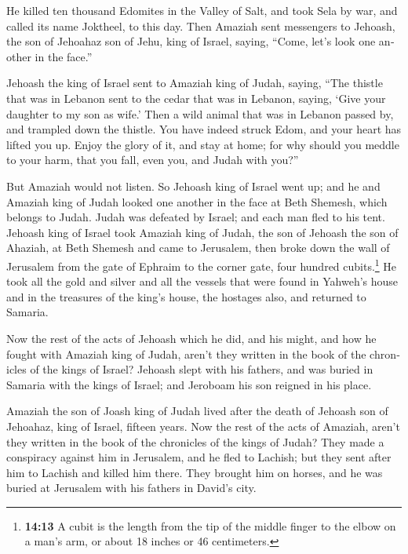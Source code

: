 \begin{paracol}{2}
\begin{otherlanguage}{english}
 He killed ten thousand Edomites in the Valley of Salt,
and took Sela by war, and called its name Joktheel, to this day.
 Then Amaziah sent messengers to Jehoash, the son of
Jehoahaz son of Jehu, king of Israel, saying, ``Come, let's look one
another in the face.''

 Jehoash the king of Israel sent to Amaziah king of Judah,
saying, ``The thistle that was in Lebanon sent to the cedar that was in
Lebanon, saying, `Give your daughter to my son as wife.' Then a wild
animal that was in Lebanon passed by, and trampled down the thistle.
 You have indeed struck Edom, and your heart has lifted
you up. Enjoy the glory of it, and stay at home; for why should you
meddle to your harm, that you fall, even you, and Judah with you?''

 But Amaziah would not listen. So Jehoash king of Israel
went up; and he and Amaziah king of Judah looked one another in the face
at Beth Shemesh, which belongs to Judah.  Judah was
defeated by Israel; and each man fled to his tent. 
Jehoash king of Israel took Amaziah king of Judah, the son of Jehoash
the son of Ahaziah, at Beth Shemesh and came to Jerusalem, then broke
down the wall of Jerusalem from the gate of Ephraim to the corner gate,
four hundred cubits.\footnote{\textbf{14:13} A cubit is the length from
  the tip of the middle finger to the elbow on a man's arm, or about 18
  inches or 46 centimeters.}  He took all the gold and
silver and all the vessels that were found in Yahweh's house and in the
treasures of the king's house, the hostages also, and returned to
Samaria.

 Now the rest of the acts of Jehoash which he did, and
his might, and how he fought with Amaziah king of Judah, aren't they
written in the book of the chronicles of the kings of Israel?
 Jehoash slept with his fathers, and was buried in
Samaria with the kings of Israel; and Jeroboam his son reigned in his
place.

 Amaziah the son of Joash king of Judah lived after the
death of Jehoash son of Jehoahaz, king of Israel, fifteen years.
 Now the rest of the acts of Amaziah, aren't they written
in the book of the chronicles of the kings of Judah? 
They made a conspiracy against him in Jerusalem, and he fled to Lachish;
but they sent after him to Lachish and killed him there. 
They brought him on horses, and he was buried at Jerusalem with his
fathers in David's city.


\end{otherlanguage}
\end{paracol}

